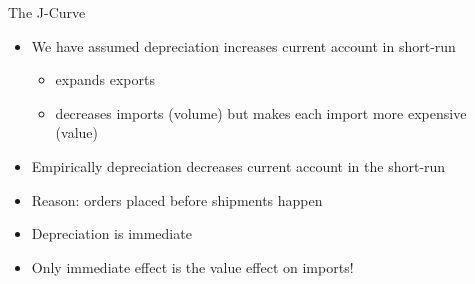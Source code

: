 \documentclass{beamer}
\begin{document}
\begin{frame}{The J-Curve}

    \begin{itemize}
        \item We have assumed depreciation increases current account in short-run
        \begin{itemize}
            \item expands exports
            \item decreases imports (volume) but makes each import more expensive (value)
        \end{itemize}
        \item Empirically depreciation decreases current account in the short-run
        \item Reason: orders placed before shipments happen
        \item Depreciation is immediate
        \item Only immediate effect is the value effect on imports!
    \end{itemize}
\end{frame}

\end{document}

